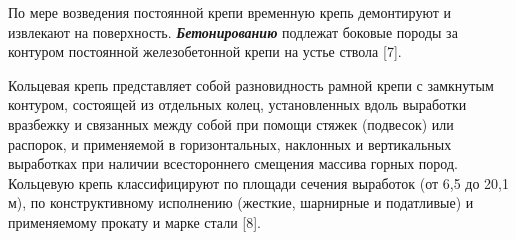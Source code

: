 \begin{multicols}{2}
По мере возведения постоянной крепи временную крепь демонтируют и
извлекают на поверхность. \emph{{\bfseries Бетонированию}} подлежат боковые
породы за контуром постоянной железобетонной крепи на устье ствола
{[}7{]}.

Кольцевая крепь представляет собой разновидность рамной крепи с
замкнутым контуром, состоящей из отдельных колец, установленных вдоль
выработки вразбежку и связанных между собой при помощи стяжек (подвесок)
или распорок, и применяемой в горизонтальных, наклонных и вертикальных
выработках при наличии всестороннего смещения массива горных пород.
Кольцевую крепь классифицируют по площади сечения выработок (от 6,5 до
20,1 м), по конструктивному исполнению (жесткие, шарнирные и податливые)
и применяемому прокату и марке стали {[}8{]}.
\end{multicols}

